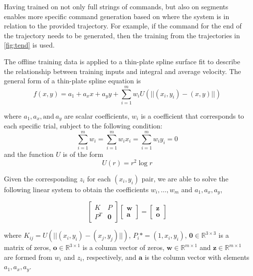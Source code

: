 \documentclass[letterpaper, 10 pt, conference]{ieeeconf}  %
\begin{document}
Having trained on not only full strings of commands, but also on segments enables more specific command generation based on where the system is in relation to the provided trajectory. For example, if the command for the end of the trajectory needs to be generated, then the training from the trajectories in \ref{fig:tend} is used.

The offline training data is applied to a thin-plate spline surface fit to describe the relationship between training inputs and integral and average velocity. The general form of a thin-plate spline equation is 
\begin{equation}
    f(x,y) = a_1 + a_xx + a_yy + \sum_{i=1}^mw_iU(||(x_i,y_i)-(x,y)||)
\end{equation}

where $a_1,a_x,\text{and}~a_y$ are scalar coefficients, $w_i$ is a coefficient that corresponds to each specific trial, subject to the following condition: \begin{equation}
\sum_{i=1}^mw_i=\sum_{i=1}^mw_ix_i=\sum_{i=1}^mw_iy_i=0
\end{equation}
and the function $U$ is of the form
\begin{equation}
  U(r) = r^2\log{r} 
\end{equation}

Given the corresponding $z_i$ for each $(x_i,y_i)$ pair, we are able to solve the following linear system to obtain the coefficients $w_i,\ldots,w_m$ and $a_1,a_x,a_y$,

\begin{equation}
    \begin{bmatrix}
    K&P\\
    P^T& \mathbf{0}
    \end{bmatrix}
    \begin{bmatrix}
    \mathbf{w}\\
    \mathbf{a}
    \end{bmatrix} = 
    \begin{bmatrix}
    \mathbf{z}\\
    \mathbf{o}
    \end{bmatrix}
\end{equation}

where $K_{ij} = U(||(x_i,y_i)-(x_j,y_j)||)$, $P_i* = (1,x_i,y_i)$, $\mathbf{0}  \in \mathbb{R}^{3\times3}$ is a matrix of zeros, $\mathbf{o} \in \mathbb{R}^{3\times1}$ is a column vector of zeros, $\mathbf{w} \in \mathbb{R}^{m\times1}$ and $\mathbf{z} \in \mathbb{R}^{m\times1}$ are formed from $w_i$ and $z_i$, respectively, and $\mathbf{a}$ is the column vector with elements $a_1,a_x,a_y$.
\end{document}
